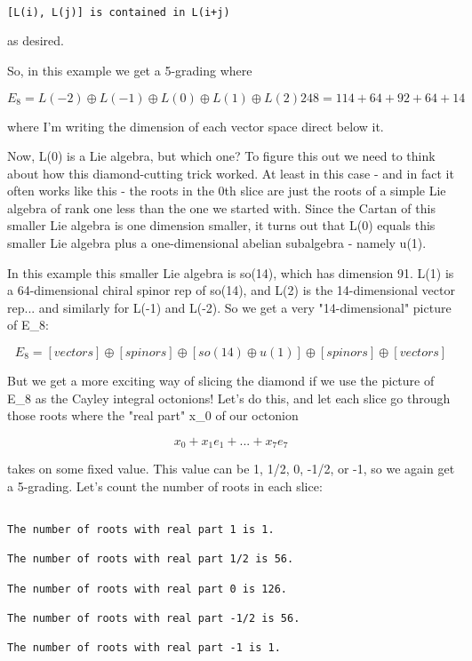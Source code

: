 \begin{verbatim}

[L(i), L(j)] is contained in L(i+j)
\end{verbatim}
    
as desired.  

So, in this example we get a 5-grading where


$$

E_{8} =  L(-2) \oplus  L(-1) \oplus  L(0) \oplus  L(1) \oplus  L(2)
248 =  114  +  64   +  92   +  64  +  14
$$
    
where I'm writing the dimension of each vector space direct below it.

Now, L(0) is a Lie algebra, but which one?  To figure this out we need
to think about how this diamond-cutting trick worked.  At least in this
case - and in fact it often works like this - the roots in the 0th slice
are just the roots of a simple Lie algebra of rank one less than the one
we started with.  Since the Cartan of this smaller Lie algebra is one
dimension smaller, it turns out that L(0) equals this smaller Lie
algebra plus a one-dimensional abelian subalgebra - namely u(1).

In this example this smaller Lie algebra is so(14), which has dimension
91.  L(1) is a 64-dimensional chiral spinor rep of so(14), and L(2) is
the 14-dimensional vector rep... and similarly for L(-1) and L(-2).  
So we get a very "14-dimensional" picture of E_{8}:


$$

E_{8} =  [vectors] \oplus  [spinors] \oplus  [so(14) \oplus  u(1)] \oplus  [spinors] \oplus  [vectors]
$$
    

But we get a more exciting way of slicing the diamond if we use the
picture of E_{8} as the Cayley integral octonions!  Let's do this, and let
each slice go through those roots where the "real part"
x_{0} of our octonion


$$

x_{0} + x_{1} e_{1} + ... + x_{7} e_{7}
$$
    
takes on some fixed value.  This value can be 1, 1/2, 0, -1/2,
or -1, so we again get a 5-grading.  Let's count the number of roots in
each slice:


\begin{verbatim}

The number of roots with real part 1 is 1.

The number of roots with real part 1/2 is 56.

The number of roots with real part 0 is 126.

The number of roots with real part -1/2 is 56.

The number of roots with real part -1 is 1.
\end{verbatim}
    

